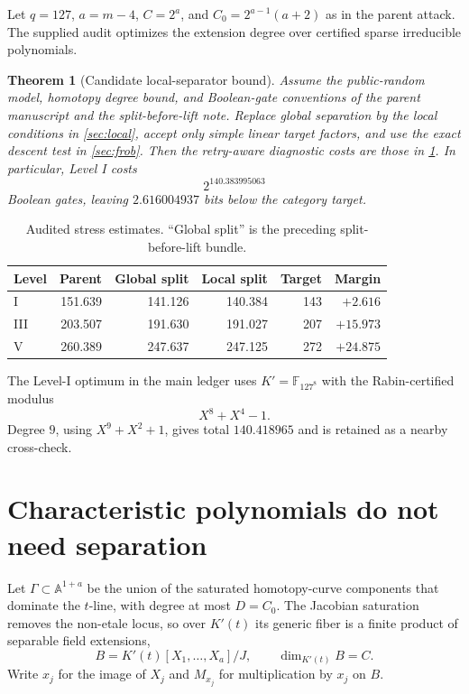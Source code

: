 \documentclass[11pt]{article}
\newtheorem{theorem}{Theorem}[section]
\theoremstyle{definition}
\newcommand{\F}{\mathbb F}
\begin{document}
Let $q=127$, $a=m-4$, $C=2^a$, and $C_0=2^{a-1}(a+2)$ as in the parent attack.  The supplied audit optimizes the extension degree over certified sparse irreducible polynomials.

\begin{theorem}[Candidate local-separator bound]\label{thm:headline}
Assume the public-random model, homotopy degree bound, and Boolean-gate conventions of the parent manuscript and the split-before-lift note.  Replace global separation by the local conditions in \cref{sec:local}, accept only simple linear target factors, and use the exact descent test in \cref{sec:frob}.  Then the retry-aware diagnostic costs are those in \cref{tab:headline}.  In particular, Level I costs
\[
 2^{140.383995063}
\]
Boolean gates, leaving $2.616004937$ bits below the category target.
\end{theorem}

\begin{table}[h]
\centering
\caption{Audited stress estimates.  ``Global split'' is the preceding split-before-lift bundle.}
\label{tab:headline}
\begin{tabular}{@{}lrrrrr@{}}
\toprule
Level & Parent & Global split & Local split & Target & Margin\\
\midrule
I   & 151.639 & 141.126 & 140.384 & 143 & $+2.616$\\
III & 203.507 & 191.630 & 191.027 & 207 & $+15.973$\\
V   & 260.389 & 247.637 & 247.125 & 272 & $+24.875$\\
\bottomrule
\end{tabular}
\end{table}

The Level-I optimum in the main ledger uses $K'=\F_{127^8}$ with the Rabin-certified modulus
\[
 X^8+X^4-1.
\]
Degree $9$, using $X^9+X^2+1$, gives total $140.418965$ and is retained as a nearby cross-check.

\section{Characteristic polynomials do not need separation}\label{sec:charpoly}

Let $\Gamma\subset\mathbb A^{1+a}$ be the union of the saturated homotopy-curve components that dominate the $t$-line, with degree at most $D=C_0$.  The Jacobian saturation removes the non-etale locus, so over $K'(t)$ its generic fiber is a finite product of separable field extensions,
\[
 B=K'(t)[X_1,\ldots,X_a]/J,
 \qquad \dim_{K'(t)}B=C.
\]
Write $x_j$ for the image of $X_j$ and $M_{x_j}$ for multiplication by $x_j$ on $B$.
\end{document}
